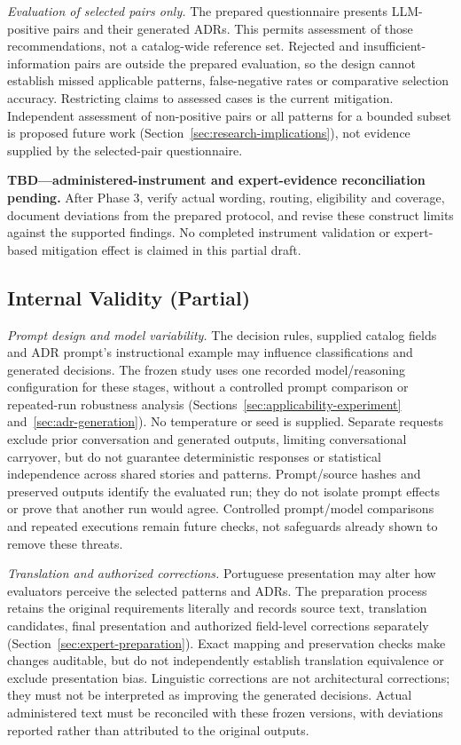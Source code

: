 \emph{Evaluation of selected pairs only.}
The prepared questionnaire presents LLM-positive pairs and their generated ADRs.
This permits assessment of those recommendations, not a catalog-wide
reference set. Rejected and insufficient-information pairs are outside
the prepared evaluation, so the design cannot establish missed applicable
patterns, false-negative rates or comparative selection accuracy.
Restricting claims to assessed cases is the current mitigation.
Independent assessment of non-positive pairs or all patterns for a bounded
subset is proposed future work (Section~\ref{sec:research-implications}),
not evidence supplied by the selected-pair questionnaire.

\noindent\textbf{TBD---administered-instrument and expert-evidence
reconciliation pending.} After Phase 3, verify actual wording, routing,
eligibility and coverage, document deviations from the prepared protocol,
and revise these construct limits against the supported findings.
No completed instrument validation or expert-based mitigation effect is
claimed in this partial draft.

\subsection{Internal Validity (Partial)}
\label{sec:internal-validity}

\emph{Prompt design and model variability.}
The decision rules, supplied catalog fields and ADR prompt's instructional
example may influence classifications and generated decisions.
The frozen study uses one recorded model/reasoning configuration for
these stages, without a controlled prompt comparison or repeated-run
robustness analysis (Sections~\ref{sec:applicability-experiment}
and~\ref{sec:adr-generation}). No temperature or seed is supplied.
Separate requests exclude prior conversation and generated outputs,
limiting conversational carryover, but do not guarantee deterministic
responses or statistical independence across shared stories and patterns.
Prompt/source hashes and preserved outputs identify the evaluated run;
they do not isolate prompt effects or prove that another run would agree.
Controlled prompt/model comparisons and repeated executions remain
future checks, not safeguards already shown to remove these threats.

\emph{Translation and authorized corrections.}
Portuguese presentation may alter how evaluators perceive the selected
patterns and ADRs. The preparation process retains the original
requirements literally and records source text, translation candidates,
final presentation and authorized field-level corrections separately
(Section~\ref{sec:expert-preparation}). Exact mapping and preservation
checks make changes auditable, but do not independently establish
translation equivalence or exclude presentation bias.
Linguistic corrections are not architectural corrections; they must not
be interpreted as improving the generated decisions.
Actual administered text must be reconciled with these frozen versions,
with deviations reported rather than attributed to the original outputs.

